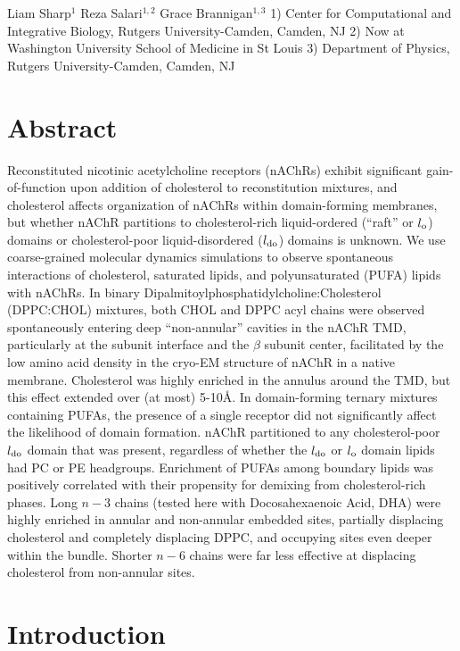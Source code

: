 {Liam Sharp$^1$}  {Reza Salari$^{1,2}$} {Grace Brannigan$^{1,3}$}
{1) Center for Computational and Integrative Biology, Rutgers University-Camden, Camden, NJ} {2) Now at Washington University School of Medicine in St Louis} {3) Department of Physics, Rutgers University-Camden, Camden, NJ}
\section{Abstract}
Reconstituted nicotinic acetylcholine receptors (nAChRs) exhibit significant gain-of-function upon addition of cholesterol to reconstitution mixtures, and cholesterol affects organization of nAChRs within domain-forming membranes, but whether nAChR partitions to cholesterol-rich liquid-ordered (``raft'' or $l_{\mathrm{o}}$) domains or cholesterol-poor liquid-disordered ($l_{\mathrm{do}}$) domains is unknown. We use coarse-grained molecular dynamics simulations to observe spontaneous interactions of cholesterol, saturated lipids, and polyunsaturated (PUFA) lipids with nAChRs. In binary Dipalmitoylphosphatidylcholine:Cholesterol (DPPC:CHOL) mixtures, both CHOL and DPPC acyl chains were observed spontaneously entering deep ``non-annular'' cavities in the nAChR TMD, particularly at the subunit interface and the $\beta$ subunit center, facilitated by the low amino acid density in the cryo-EM structure of nAChR in a native membrane. Cholesterol was highly enriched in the annulus around the TMD, but this effect extended over (at most) 5-10\AA. In domain-forming ternary mixtures containing PUFAs, the presence of a single receptor did not significantly affect the likelihood of domain formation.  nAChR partitioned to any cholesterol-poor $l_{\mathrm{do}}$ domain that was present, regardless of whether the $l_{\mathrm{do}}$ or $l_{\mathrm{o}}$ domain lipids had PC or PE headgroups. Enrichment of PUFAs among boundary lipids was positively correlated with their propensity for demixing from cholesterol-rich phases. Long $n - 3$ chains (tested here with Docosahexaenoic Acid, DHA) were highly enriched in annular and non-annular embedded sites, partially displacing cholesterol and completely displacing DPPC, and occupying sites even deeper within the bundle. Shorter $n - 6$ chains were far less effective at displacing cholesterol from non-annular sites.

\section{Introduction}
\label{S:1}


